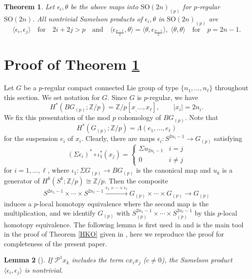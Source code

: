 \documentclass[12pt]{amsart}
\numberwithin{equation}{section}
\newtheorem{theorem}{Theorem}[section]
\newtheorem{lemma}[theorem]{Lemma}
\theoremstyle{definition}
\theoremstyle{remark}
\begin{document}
\begin{theorem}
\label{main}
Let $\epsilon_i,\theta$ be the above maps into ${\mathrm{SO}}(2n)_{(p)}$ for $p$-regular ${\mathrm{SO}}(2n)$. All nontrivial Samelson products of $\epsilon_i,\theta$ in ${\mathrm{SO}}(2n)_{(p)}$ are
$$\langle\epsilon_i,\epsilon_j\rangle\quad\text{for}\quad 2i+2j>p\quad\text{and}\quad\langle\epsilon_{\frac{p-1}{2}},\theta\rangle=\langle\theta,\epsilon_{\frac{p-1}{2}}\rangle,\;\langle\theta,\theta\rangle\quad\text{for}\quad p=2n-1.$$
\end{theorem}

\section{Proof of Theorem \ref{main}}

Let $G$ be a $p$-regular compact connected Lie group of type $\{n_1,\ldots,n_\ell\}$ throughout this section. We set notation for $G$. Since $G$ is $p$-regular, we have
$$H^*(BG_{(p)};{\mathbb{Z}}/p)={\mathbb{Z}}/p[x_,\ldots,x_\ell],\qquad|x_i|=2n_i.$$
We fix this presentation of the mod $p$ cohomology of $BG_{(p)}$. Note that 
$$H^*(G_{(p)};{\mathbb{Z}}/p)=\Lambda(e_1,\ldots,e_\ell)$$ 
for the suspension $e_i$ of $x_i$. Clearly, there are maps $\epsilon_i:S^{2n_i-1}\to G_{(p)}$ satisfying 
\begin{equation}
\label{epsilon}
(\Sigma\epsilon_i)^*\circ\iota_1^*(x_j)=\begin{cases}\Sigma u_{2n_i-1}&i=j\\0&i\ne j\end{cases}
\end{equation}
for $i=1,\ldots,\ell$, where $\iota_1:\Sigma G_{(p)}\to BG_{(p)}$ is the canonical map and $u_k$ is a generator of $H^k(S^k;{\mathbb{Z}}/p)\cong{\mathbb{Z}}/p$. Then the composite
$$S^{2n_1-1}\times\cdots\times S^{2n_\ell-1}\xrightarrow{\epsilon_1\times\cdots\times\epsilon_\ell}G_{(p)}\times\cdots\times G_{(p)}\to G_{(p)}$$
induces a $p$-local homotopy equivalence where the second map is the multiplication, and we identify $G_{(p)}$ with $S^{2n_1-1}_{(p)}\times\cdots\times S^{2n_\ell-1}_{(p)}$ by this $p$-local homotopy equivalence. The following lemma is first used in \cite{KO} and is the main tool in the proof of Theorem \ref{HKO} given in \cite{HKO}, here we reproduce the proof for completeness of the present paper.

\begin{lemma}
[{\cite[Proof of Theorem 1.1]{KO}}]
\label{criterion}
If $\mathcal{P}^1x_k$ includes the term $cx_ix_j$ ($c\ne 0$), the Samelson product $\langle\epsilon_i,\epsilon_j\rangle$ is nontrivial.
\end{lemma}
\end{document}
